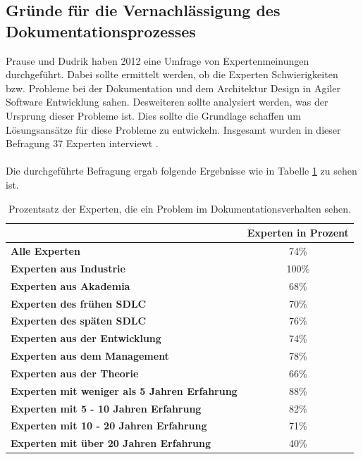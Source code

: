 \documentclass[a4paper,12pt]{scrartcl}
\begin{document}
\subsection{Gründe für die Vernachlässigung des Dokumentationsprozesses}
Prause und Dudrik haben 2012 eine Umfrage von Expertenmeinungen durchgeführt. Dabei sollte ermittelt werden, ob die Experten Schwierigkeiten bzw. Probleme bei der Dokumentation und dem Architektur Design in Agiler Software Entwicklung sahen. Desweiteren sollte analysiert werden, was der Ursprung dieser Probleme ist. Dies sollte die Grundlage schaffen um Lösungsansätze für diese Probleme zu entwickeln. Insgesamt wurden in dieser Befragung 37 Experten interviewt \cite{Prause2012}.
\\\\
Die durchgeführte Befragung ergab folgende Ergebnisse wie in Tabelle \ref{ProblemTabelle} zu sehen ist.
\begin{table}[htb]
\begin{tabular}{|l|c|}\hline
\rule{0pt}{15pt}  & \textbf{Experten in Prozent}
\\
\hline
\rule{0pt}{15pt} \textbf{Alle Experten} & 74\%\\ 
\hline
\rule{0pt}{15pt} \textbf{Experten aus Industrie} & 100\% \\
\hline
\rule{0pt}{15pt} \textbf{Experten aus Akademia} & 68\%\\
\hline
\rule{0pt}{15pt} \textbf{Experten des frühen SDLC} & 70\%\\
\hline
\rule{0pt}{15pt} \textbf{Experten des späten SDLC} & 76\%\\
\hline
\rule{0pt}{15pt} \textbf{Experten aus der Entwicklung} & 74\%\\
\hline
\rule{0pt}{15pt} \textbf{Experten aus dem Management} & 78\%\\
\hline
\rule{0pt}{15pt} \textbf{Experten aus der Theorie} & 66\%\\
\hline
\rule{0pt}{15pt} \textbf{Experten mit weniger als 5 Jahren Erfahrung} & 88\%\\
\hline
\rule{0pt}{15pt} \textbf{Experten mit 5 - 10 Jahren Erfahrung} & 82\%\\
\hline
\rule{0pt}{15pt} \textbf{Experten mit 10 - 20 Jahren Erfahrung} & 71\%\\
\hline
\rule{0pt}{15pt} \textbf{Experten mit über 20 Jahren Erfahrung} & 40\%\\
\hline
\end{tabular}
\caption{Prozentsatz der Experten, die ein Problem im Dokumentationsverhalten sehen.}
\label{ProblemTabelle}
\end{table}
\end{document}
